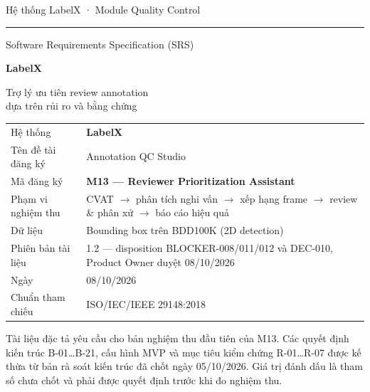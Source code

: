 \begin{titlepage}
  \sffamily
  {\color{lxgray}\small Hệ thống LabelX · Module Quality Control\par}
  \vspace{0.4cm}
  {\color{lxblue}\rule{\linewidth}{1.2pt}\par}
  \vspace{1.2cm}
  {\Large\color{lxgray} Software Requirements Specification (SRS)\par}
  \vspace{0.5cm}
  {\fontsize{34}{40}\selectfont\bfseries\color{lxnavy} LabelX\par}
  \vspace{0.4cm}
  {\Large\color{lxnavy} Trợ lý ưu tiên review annotation\\dựa trên rủi ro và bằng chứng\par}
  \vspace{1.0cm}
  \begin{tabular}{@{}L{4.2cm}L{9cm}@{}}
    \color{lxgray}Hệ thống & \textbf{LabelX}\\
    \color{lxgray}Tên đề tài đăng ký & Annotation QC Studio\\
    \color{lxgray}Mã đăng ký & \textbf{M13 — Reviewer Prioritization Assistant}\\
    \color{lxgray}Phạm vi nghiệm thu & CVAT $\rightarrow$ phân tích nghi vấn $\rightarrow$ xếp hạng frame $\rightarrow$ review \& phân xử $\rightarrow$ báo cáo hiệu quả\\
    \color{lxgray}Dữ liệu & Bounding box trên BDD100K (2D detection)\\
    \color{lxgray}Phiên bản tài liệu & 1.2 — disposition BLOCKER-008/011/012 và DEC-010, Product Owner duyệt 08/10/2026\\
    \color{lxgray}Ngày & 08/10/2026\\
    \color{lxgray}Chuẩn tham chiếu & ISO/IEC/IEEE 29148:2018\\
  \end{tabular}
  \vfill
  \begin{tcolorbox}[colback=lxgrayl, colframe=lxline, boxrule=0.4pt, arc=2pt]
    \small\rmfamily
    Tài liệu đặc tả yêu cầu cho bản nghiệm thu đầu tiên của M13. Các quyết định
    kiến trúc B-01…B-21, cấu hình MVP và mục tiêu kiểm chứng R-01…R-07 được kế
    thừa từ bản rà soát kiến trúc đã chốt ngày 05/10/2026. Giá trị đánh dấu
    \TBD{} là tham số chưa chốt và phải được quyết định trước khi đo nghiệm thu.
  \end{tcolorbox}
  \restoregeometry
\end{titlepage}

